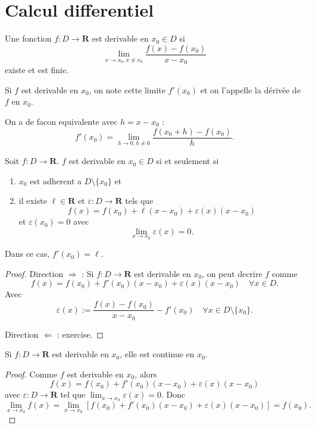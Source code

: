 \chapter{Calcul differentiel}

\begin{definition}
Une fonction $f:D\to \mathbf{R}$ est derivable en $x_{0}\in D$ si
$$
\lim_{ x \to x_{0},x\neq x_{0} } \frac{f(x)-f(x_{0})}{x-x_{0}} 
$$
existe et est finie.
\end{definition}
\begin{notation}
Si $f$ est derivable en $x_{0}$, on note cette limite $f'(x_{0})$ et on l'appelle la dérivée de $f$ en $x_{0}$.
\end{notation}
\begin{remark}
On a de facon equivalente avec $h=x-x_{0}$ :
$$
f'(x_{0})=\lim_{ h \to 0,h\neq 0 } \frac{f(x_{0}+h)-f(x_{0})}{h}. 
$$
\end{remark}
\begin{proposition}
Soit $f:D\to \mathbf{R}$. $f$ est derivable en $x_{0}\in D$ si et seulement si
\begin{enumerate}
\item $x_{0}$ est adherent a $D\setminus \{ x_{0} \}$ et
\item il existe $\ell \in \mathbf{R}$ et $\varepsilon:D\to \mathbf{R}$ tels que
$$
f(x)=f(x_{0})+\ell(x-x_{0})+\varepsilon(x)(x-x_{0})
$$
et $\varepsilon(x_{0})=0$ avec
$$
\lim_{ x \to x_{0} } \varepsilon(x)=0.
$$
\end{enumerate}
Dans ce cas, $f'(x_{0})=\ell$.
\end{proposition}
\begin{proof}
\item Direction $\Rightarrow$ : Si $f:D\to \mathbf{R}$ est derivable en $x_{0}$, on peut decrire $f$ comme
$$
f(x)=f(x_{0})+f'(x_{0})(x-x_{0})+\varepsilon(x)(x-x_{0})\quad \forall x \in D.
$$
Avec
$$
\varepsilon(x):= \frac{f(x)-f(x_{0})}{x-x_{0}}-f'(x_{0})\quad \forall x \in D\setminus \{ x_{0} \}.
$$
\item Direction $\Leftarrow$ : exercise.
\end{proof}

\begin{corollary}
Si $f:D\to \mathbf{R}$ est derivable en $x_{0}$, elle est continue en $x_{0}$. 
\end{corollary}
\begin{proof}
Comme $f$ est derivable en $x_{0}$, alors
$$
f(x)=f(x_{0})+f'(x_{0})(x-x_{0})+\varepsilon(x)(x-x_{0})
$$
avec $\varepsilon:D\to \mathbf{R}$ tel que $\lim_{ x \to x_{0} }\varepsilon(x)=0$. Donc
$$
\lim_{ x \to x_{0} } f(x)=\lim_{ x \to x_{0} } [f(x_{0})+f'(x_{0})(x-x_{0})+\varepsilon(x)(x-x_{0})]=f(x_{0}).
$$
\end{proof}

